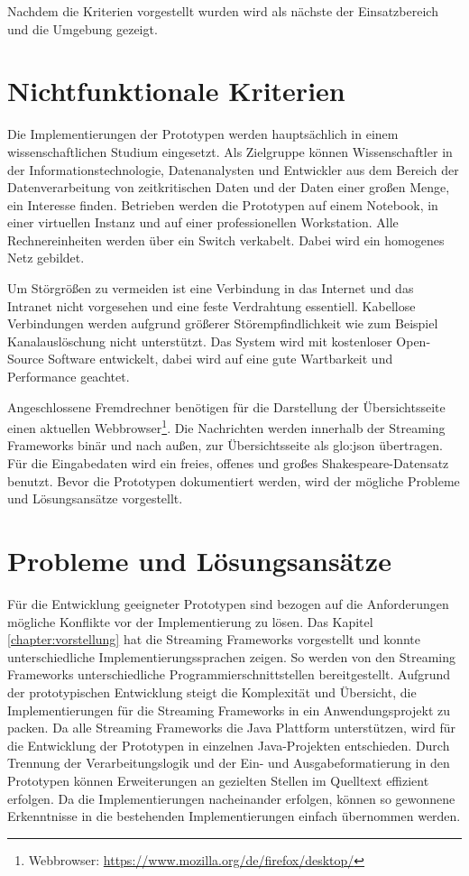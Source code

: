 Nachdem die Kriterien vorgestellt wurden wird als nächste der Einsatzbereich und die Umgebung gezeigt.

\section{Nichtfunktionale Kriterien}
\label{sec:nichtFunktAnforderung}

Die Implementierungen der Prototypen werden hauptsächlich in einem wissenschaftlichen Studium eingesetzt. Als Zielgruppe können Wissenschaftler in der Informationstechnologie, Datenanalysten und Entwickler aus dem Bereich der Datenverarbeitung von zeitkritischen Daten und der Daten einer großen Menge, ein Interesse finden. Betrieben werden die Prototypen auf einem Notebook, in einer virtuellen Instanz und auf einer professionellen Workstation. Alle Rechnereinheiten werden über ein Switch verkabelt. Dabei wird ein homogenes Netz gebildet. 

Um Störgrößen zu vermeiden ist eine Verbindung in das Internet und das Intranet nicht vorgesehen und eine feste Verdrahtung essentiell. Kabellose Verbindungen werden aufgrund größerer Störempfindlichkeit wie zum Beispiel Kanalauslöschung nicht unterstützt. Das System wird mit kostenloser Open-Source Software entwickelt, dabei wird auf eine gute Wartbarkeit und Performance geachtet.

Angeschlossene Fremdrechner benötigen für die Darstellung der Übersichtsseite einen aktuellen Webbrowser\footnote{Webbrowser: \url{https://www.mozilla.org/de/firefox/desktop/}}. Die Nachrichten werden innerhalb der Streaming Frameworks binär und nach außen, zur Übersichtsseite als \gls{glo:json} übertragen. Für die Eingabedaten wird ein freies, offenes und großes Shakespeare-Datensatz  benutzt. Bevor die Prototypen dokumentiert werden, wird der mögliche Probleme und Lösungsansätze vorgestellt.

\section{Probleme und Lösungsansätze}
\label{sec:loesungsansatz}

Für die Entwicklung geeigneter Prototypen sind bezogen auf die Anforderungen mögliche Konflikte vor der Implementierung zu lösen. Das Kapitel \ref{chapter:vorstellung} hat die Streaming Frameworks vorgestellt und konnte unterschiedliche Implementierungssprachen zeigen. So werden von den Streaming Frameworks unterschiedliche Programmierschnittstellen bereitgestellt. Aufgrund der prototypischen Entwicklung steigt die Komplexität und Übersicht, die Implementierungen für die Streaming Frameworks in ein Anwendungsprojekt zu packen. Da alle Streaming Frameworks die Java Plattform unterstützen, wird für die Entwicklung der Prototypen in einzelnen Java-Projekten entschieden. Durch Trennung der Verarbeitungslogik und der Ein- und Ausgabeformatierung in den Prototypen können Erweiterungen an gezielten Stellen im Quelltext effizient erfolgen. Da die Implementierungen nacheinander erfolgen, können so gewonnene Erkenntnisse in die bestehenden Implementierungen einfach übernommen werden. 


